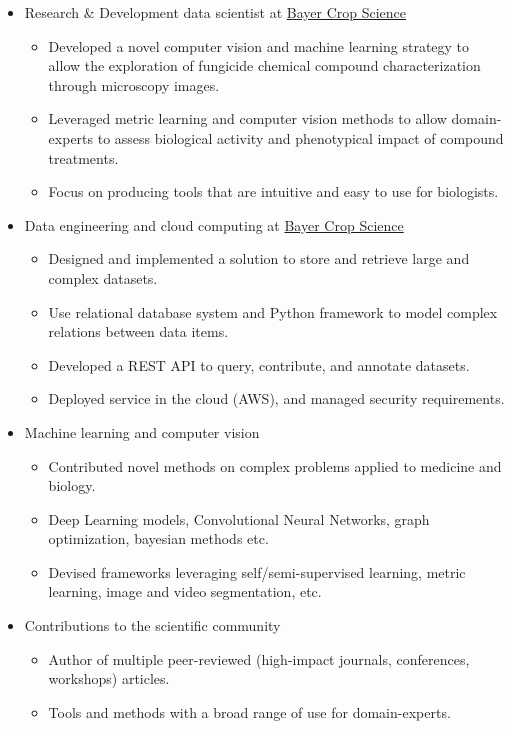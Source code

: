 \documentclass[12pt,a4paper]{awesome-cv}
\begin{document}
\begin{cvparagraph}
\begin{itemize}
\item Research \& Development data scientist at \href{https://www.bayer.com/en/agriculture}{Bayer Crop Science}
\begin{itemize}
\item Developed a novel computer vision and machine learning strategy to allow the exploration of fungicide chemical compound characterization through microscopy images.
\item Leveraged metric learning and computer vision methods to allow domain-experts to assess biological activity and phenotypical impact of compound treatments.
\item Focus on producing tools that are intuitive and easy to use for biologists.
\end{itemize}
\item Data engineering and cloud computing at \href{https://www.bayer.com/en/agriculture}{Bayer Crop Science}
\begin{itemize}
\item Designed and implemented a solution to store and retrieve large and complex datasets.
\item Use relational database system and Python framework to model complex relations between data items.
\item Developed a REST API to query, contribute, and annotate datasets.
\item Deployed service in the cloud (AWS), and managed security requirements.
\end{itemize}
\item Machine learning and computer vision
\begin{itemize}
\item Contributed novel methods on complex problems applied to medicine and biology.
\item Deep Learning models, Convolutional Neural Networks, graph optimization, bayesian methods etc.
\item Devised frameworks leveraging self/semi-supervised learning, metric learning, image and video segmentation, etc.
\end{itemize}
\item Contributions to the scientific community
\begin{itemize}
\item Author of multiple peer-reviewed (high-impact journals, conferences, workshops) articles.
\item Tools and methods with a broad range of use for domain-experts.
\end{itemize}
\end{itemize}


\end{cvparagraph}
\end{document}
